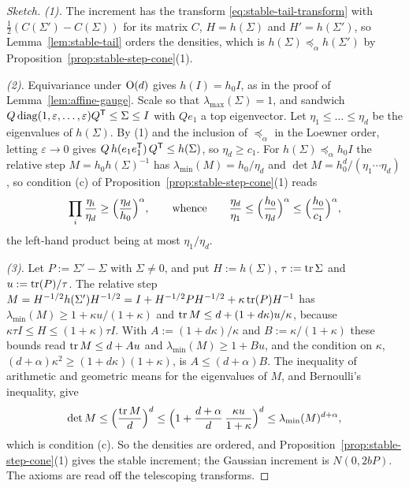 \begin{proof}[Sketch]
\emph{(1).} The increment has the transform \ref{eq:stable-tail-transform} with
$\tfrac12(C(\Sigma') - C(\Sigma))$ for its matrix $C$, $H = h(\Sigma)$ and $H' = h(\Sigma')$, so
Lemma~\ref{lem:stable-tail} orders the \Levy{} densities, which is $h(\Sigma) \preceq_\alpha h(\Sigma')$ by
Proposition~\ref{prop:stable-step-cone}(1).

\emph{(2).} Equivariance under $\mathrm{O}(d)$ gives $h(I) = h_0I$, as in the proof of
Lemma~\ref{lem:affine-gauge}. Scale so that $\lambda_{\max}(\Sigma) = 1$, and sandwich
$Q\operatorname{diag}(1, \varepsilon, \dots, \varepsilon)Q^{\mathsf{T}} \le \Sigma \le I$ with $Qe_1$ a top eigenvector. Let
$\eta_1 \le \dots \le \eta_d$ be the eigenvalues of $h(\Sigma)$. By (1) and the inclusion of
$\preceq_\alpha$ in the Loewner order, letting $\varepsilon \to 0$ gives
$Q\,h(e_1e_1^{\mathsf{T}})\,Q^{\mathsf{T}} \le h(\Sigma)$, so $\eta_d \ge c_1$. For $h(\Sigma) \preceq_\alpha h_0I$ the
relative step $M = h_0h(\Sigma)^{-1}$ has $\lambda_{\min}(M) = h_0/\eta_d$ and
$\det M = h_0^d/(\eta_1\cdots\eta_d)$, so condition (c) of Proposition~\ref{prop:stable-step-cone}(1) reads
\[
  \prod_i\frac{\eta_i}{\eta_d} \ge \Bigl(\frac{\eta_d}{h_0}\Bigr)^\alpha ,
  \qquad\text{whence}\qquad
  \frac{\eta_d}{\eta_1} \le \Bigl(\frac{h_0}{\eta_d}\Bigr)^\alpha \le \Bigl(\frac{h_0}{c_1}\Bigr)^\alpha ,
\]
the left-hand product being at most $\eta_1/\eta_d$.

\emph{(3).} Let $P := \Sigma' - \Sigma$ with $\Sigma \ne 0$, and put $H := h(\Sigma)$,
$\tau := \operatorname{tr}\Sigma$ and $u := \operatorname{tr}(P)/\tau$. The relative step
$M = H^{-1/2}h(\Sigma')H^{-1/2} = I + H^{-1/2}PH^{-1/2} + \kappa\operatorname{tr}(P)H^{-1}$ has
$\lambda_{\min}(M) \ge 1 + \kappa u/(1+\kappa)$ and $\operatorname{tr} M \le d + (1+d\kappa)u/\kappa$, because
$\kappa\tau I \le H \le (1+\kappa)\tau I$. With $A := (1+d\kappa)/\kappa$ and $B := \kappa/(1+\kappa)$
these bounds read $\operatorname{tr} M \le d + Au$ and $\lambda_{\min}(M) \ge 1 + Bu$, and the condition on $\kappa$,
$(d+\alpha)\kappa^2 \ge (1+d\kappa)(1+\kappa)$, is $A \le (d+\alpha)B$. The inequality of arithmetic and
geometric means for the eigenvalues of $M$, and Bernoulli's inequality, give
\[
  \det M \le \Bigl(\frac{\operatorname{tr} M}{d}\Bigr)^d
  \le \Bigl(1 + \frac{d+\alpha}{d}\,\frac{\kappa u}{1+\kappa}\Bigr)^d
  \le \lambda_{\min}(M)^{d+\alpha} ,
\]
which is condition (c). So the densities are ordered, and
Proposition~\ref{prop:stable-step-cone}(1) gives the stable increment; the Gaussian increment is
$N(0, 2bP)$. The axioms are read off the telescoping transforms.
\end{proof}

